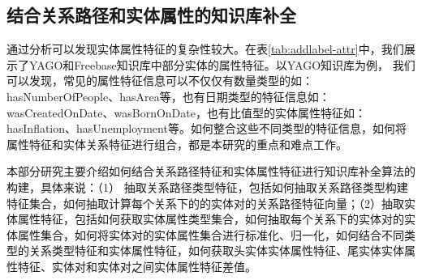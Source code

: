 \subsection{结合关系路径和实体属性的知识库补全}
通过分析可以发现实体属性特征的复杂性较大。在表\ref{tab:addlabel-attr}中，我们展示了YAGO和Freebase知识库中部分实体的属性特征。以YAGO知识库为例，
我们可以发现，常见的属性特征信息可以不仅仅有数量类型的如：hasNumberOfPeople、hasArea等，也有日期类型的特征信息如：wasCreatedOnDate、wasBornOnDate，也有比值型的实体属性特征如：hasInflation、hasUnemployment等。如何整合这些不同类型的特征信息，如何将属性特征和实体关系特征进行组合，都是本研究的重点和难点工作。

本部分研究主要介绍如何结合关系路径特征和实体属性特征进行知识库补全算法的构建，具体来说：（1）
抽取关系路径类型特征，包括如何抽取关系路径类型构建特征集合，如何抽取计算每个关系下的的实体对的关系路径特征向量；（2）抽取实体属性特征，包括如何获取实体属性类型集合，如何抽取每个关系下的实体对的实体属性集合，如何将实体对的实体属性集合进行标准化、归一化，如何结合不同类型的关系类型特征和实体属性特征，如何获取头实体实体属性特征、尾实体实体属性特征、实体对和实体对之间实体属性特征差值。

